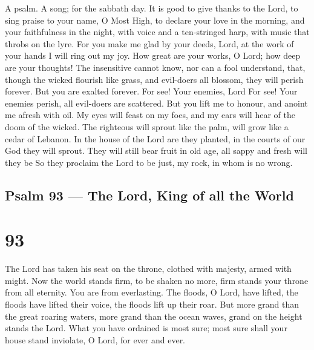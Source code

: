 A psalm. A song; for the sabbath day.  It is good to give
thanks to the Lord, to sing praise to your name, O Most High,
 to declare your love in the morning, and your faithfulness
in the night,  with voice and a ten-stringed harp, with
music that throbs on the lyre.  For you make me glad by your
deeds, Lord, at the work of your hands I will ring out my joy.
 How great are your works, O Lord; how deep are your
thoughts!  The insensitive cannot know, nor can a fool
understand,  that, though the wicked flourish like grass,
and evil-doers all blossom, they will perish forever.  But
you are exalted forever.  For see! Your enemies, Lord For
see! Your enemies perish, all evil-doers are scattered. 
But you lift me to honour, and anoint me afresh with oil. 
My eyes will feast on my foes, and my ears will hear of the doom of the
wicked.  The righteous will sprout like the palm, will grow
like a cedar of Lebanon.  In the house of the Lord are they
planted, in the courts of our God they will sprout.  They
will still bear fruit in old age, all sappy and fresh will they be
 So they proclaim the Lord to be just, my rock, in whom is
no wrong.

\hypertarget{psalm-93-the-lord-king-of-all-the-world}{%
\subsection{Psalm 93 --- The Lord, King of all the
World}\label{psalm-93-the-lord-king-of-all-the-world}}

\hypertarget{section-92}{%
\section{93}\label{section-92}}

 The Lord has taken his seat on the throne, clothed with
majesty, armed with might. Now the world stands firm, to be shaken no
more,  firm stands your throne from all eternity. You are
from everlasting.  The floods, O Lord, have lifted, the
floods have lifted their voice, the floods lift up their roar.
 But more grand than the great roaring waters, more grand
than the ocean waves, grand on the height stands the Lord. 
What you have ordained is most sure; most sure shall your house stand
inviolate, O Lord, for ever and ever.

